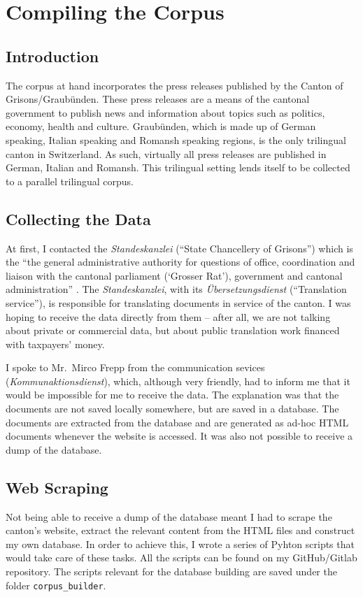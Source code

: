 \chapter{Compiling the Corpus}
\label{chap:compiling}
\section{Introduction}

The corpus at hand incorporates the press releases published by the Canton of Grisons/Graubünden. 
These press releases are a means of the cantonal government to publish news and information about topics such as politics, economy, health and culture. 
Graubünden, which is made up of German speaking, Italian speaking and Romansh speaking regions, is the only trilingual canton in Switzerland. 
As such, virtually all press releases are published in German, Italian and Romansh. 
This trilingual setting lends itself to be collected to a parallel trilingual corpus.

\section{Collecting the Data}
At first, I contacted the \emph{Standeskanzlei} (\enquote{State Chancellery of Grisons}) which is the \enquote{the general administrative authority for questions of office, coordination and liaison with the cantonal parliament (\enquote{Grosser Rat}), government and cantonal administration} \autocite{staka}. 
The \emph{Standeskanzlei}, with its \emph{Übersetzungsdienst} (\enquote{Translation service}), is responsible for translating documents in service of the canton.
I was hoping to receive the data directly from them -- after all, we are not talking about private or commercial data, but about public translation work financed with taxpayers' money.

I spoke to Mr.~Mirco Frepp from the communication sevices (\emph{Kommunaktionsdienst}), which, although very friendly, had to inform me that it would be impossible for me to receive the data. 
The explanation was that the documents are not saved locally somewhere, but are saved in a database. 
The documents are extracted from the database and are generated as ad-hoc HTML documents whenever the website is accessed. 
It was also not possible to receive a dump of the database.

\section{Web Scraping}
Not being able to receive a dump of the database meant I had to scrape the canton's website, extract the relevant content from the HTML files and construct my own database. In order to achieve this, I wrote a series of Pyhton scripts that would take care of these tasks. 
All the scripts can be found on my GitHub/Gitlab repository. 
The scripts relevant for the database building are saved under the folder \texttt{corpus\_builder}.

